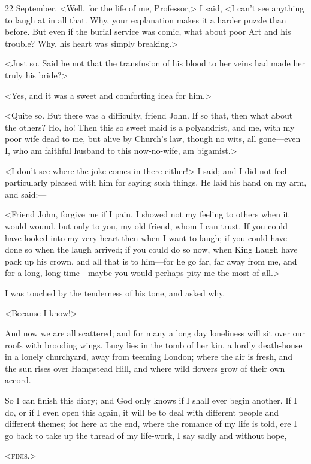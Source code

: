 \begin{diary}{22 September.}
<Well, for the life of me, Professor,> I said, <I can't see anything to laugh at in all that. Why, your explanation makes it a harder puzzle than before. But even if the burial service was comic, what about poor Art and his trouble? Why, his heart was simply breaking.>

<Just so. Said he not that the transfusion of his blood to her veins had made her truly his bride?>

<Yes, and it was a sweet and comforting idea for him.>

<Quite so. But there was a difficulty, friend John. If so that, then what about the others? Ho, ho! Then this so sweet maid is a polyandrist, and me, with my poor wife dead to me, but alive by Church's law, though no wits, all gone—even I, who am faithful husband to this now-no-wife, am bigamist.>

<I don't see where the joke comes in there either!> I said; and I did not feel particularly pleased with him for saying such things. He laid his hand on my arm, and said:—

<Friend John, forgive me if I pain. I showed not my feeling to others when it would wound, but only to you, my old friend, whom I can trust. If you could have looked into my very heart then when I want to laugh; if you could have done so when the laugh arrived; if you could do so now, when King Laugh have pack up his crown, and all that is to him—for he go far, far away from me, and for a long, long time—maybe you would perhaps pity me the most of all.>

I was touched by the tenderness of his tone, and asked why.

<Because I know!>

And now we are all scattered; and for many a long day loneliness will sit over our roofs with brooding wings. Lucy lies in the tomb of her kin, a lordly death-house in a lonely churchyard, away from teeming London; where the air is fresh, and the sun rises over Hampstead Hill, and where wild flowers grow of their own accord.

So I can finish this diary; and God only knows if I shall ever begin another. If I do, or if I even open this again, it will be to deal with different people and different themes; for here at the end, where the romance of my life is told, ere I go back to take up the thread of my life-work, I say sadly and without hope,

<\centering\scshape{finis}.>

\end{diary}

